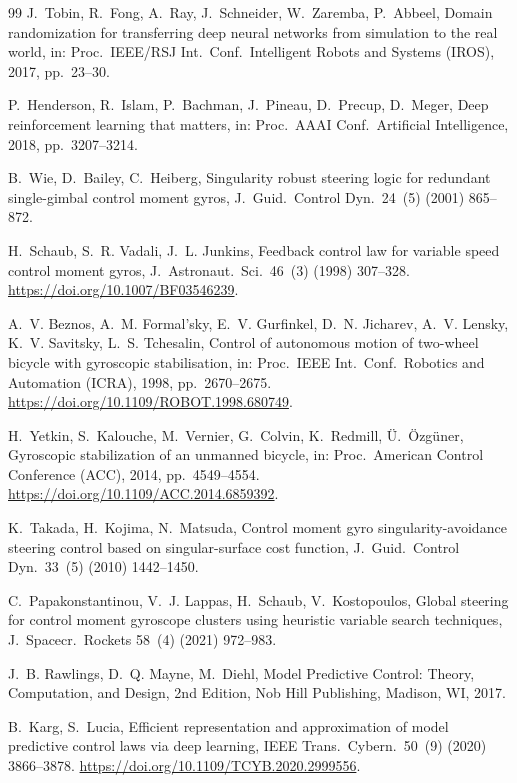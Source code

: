 \documentclass[preprint,12pt,authoryear=false]{elsarticle}
\theoremstyle{remark}\newtheorem{remark}{Remark}
\theoremstyle{plain}\newtheorem{proposition}{Proposition}\newtheorem{lemma}{Lemma}
\theoremstyle{definition}\newtheorem{assumption}{Assumption}
\begin{document}
\begin{thebibliography}{99}
J.~Tobin, R.~Fong, A.~Ray, J.~Schneider, W.~Zaremba, P.~Abbeel,
Domain randomization for transferring deep neural networks from simulation to the real world,
in: Proc.\ IEEE/RSJ Int.\ Conf.\ Intelligent Robots and Systems (IROS), 2017, pp.~23--30.

P.~Henderson, R.~Islam, P.~Bachman, J.~Pineau, D.~Precup, D.~Meger,
Deep reinforcement learning that matters,
in: Proc.\ AAAI Conf.\ Artificial Intelligence, 2018, pp.~3207--3214.

B.~Wie, D.~Bailey, C.~Heiberg,
Singularity robust steering logic for redundant single-gimbal control moment gyros,
J.\ Guid.\ Control Dyn.\ 24~(5) (2001) 865--872.

H.~Schaub, S.~R. Vadali, J.~L. Junkins,
Feedback control law for variable speed control moment gyros,
J.\ Astronaut.\ Sci.\ 46~(3) (1998) 307--328.
\url{https://doi.org/10.1007/BF03546239}.

A.~V. Beznos, A.~M. Formal'sky, E.~V. Gurfinkel, D.~N. Jicharev, A.~V. Lensky, K.~V. Savitsky, L.~S. Tchesalin,
Control of autonomous motion of two-wheel bicycle with gyroscopic stabilisation,
in: Proc.\ IEEE Int.\ Conf.\ Robotics and Automation (ICRA), 1998, pp.~2670--2675.
\url{https://doi.org/10.1109/ROBOT.1998.680749}.

H.~Yetkin, S.~Kalouche, M.~Vernier, G.~Colvin, K.~Redmill, {\"U}.~{\"O}zg{\"u}ner,
Gyroscopic stabilization of an unmanned bicycle,
in: Proc.\ American Control Conference (ACC), 2014, pp.~4549--4554.
\url{https://doi.org/10.1109/ACC.2014.6859392}.

K.~Takada, H.~Kojima, N.~Matsuda,
Control moment gyro singularity-avoidance steering control based on singular-surface cost function,
J.\ Guid.\ Control Dyn.\ 33~(5) (2010) 1442--1450.

C.~Papakonstantinou, V.~J. Lappas, H.~Schaub, V.~Kostopoulos,
Global steering for control moment gyroscope clusters using heuristic variable search techniques,
J.\ Spacecr.\ Rockets 58~(4) (2021) 972--983.

J.~B. Rawlings, D.~Q. Mayne, M.~Diehl,
Model Predictive Control: Theory, Computation, and Design,
2nd Edition, Nob Hill Publishing, Madison, WI, 2017.

B.~Karg, S.~Lucia,
Efficient representation and approximation of model predictive control laws via deep learning,
IEEE Trans.\ Cybern.\ 50~(9) (2020) 3866--3878.
\url{https://doi.org/10.1109/TCYB.2020.2999556}.


\end{thebibliography}
\end{document}
